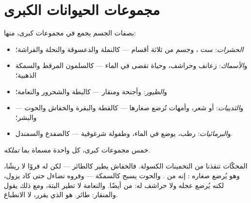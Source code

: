 \section{مجموعات الحيوانات الكبرى}

\begin{proposition}\label{prop:g3:sorting-living-things:groups}
 بصفات الجسم يجمع  في مجموعات كبرى، منها:
\begin{itemize}
  \item \emph{الحشرات}: ست ، وجسم من ثلاثة أقسام
        --- كالنملة والدعسوقة والنحلة والفراشة؛
  \item و\emph{الأسماك}: زعانف وحراشف، وحياة تقضى في
        الماء --- كالسلمون المرقط والسمكة الذهبية؛
  \item و\emph{الطيور}:  وأجنحة ومنقار --- كالبطة
        والشحرور والنعامة؛
  \item و\emph{الثدييات}:  أو شعر، وأمهات تُرضع
        صغارها  --- كالقطة والبقرة والخفاش والحوت ---
        والبشر؛
  \item و\emph{البرمائيات}:  رطب،  يوضع في
        الماء، وطفولة شرغوفية --- كالضفدع والسمندل.
\end{itemize}
\end{proposition}
\admitted

\begin{omfigure}

{\small خمس مجموعات كبرى، كل واحدة مسماة بما \emph{تملكه}.}
\end{omfigure}

\begin{example}\label{ex:g3:sorting-living-things:surprises}
المحكّات تنقذنا من التخمينات الكسولة. فالخفاش يطير كالطائر ---
لكن له فروًا لا ريشًا، وهو يُرضع صغاره : إنه من .
والحوت يسبح كالسمكة --- وفروه تضاءل حتى كاد يزول، لكنه يُرضع عجله
 ولا حراشف له: من  أيضًا. والنعامة لا تطير البتة،
ومع ذلك يقول  والمنقار: طائر.  هو الذي يقرر، لا
الانطباع.
\end{example}

